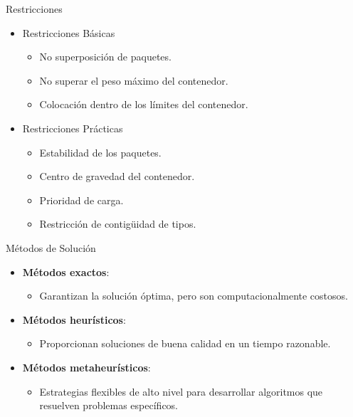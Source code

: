 \documentclass{beamer}
\begin{document}
\begin{frame}{Restricciones}
    \begin{itemize}[<+-| alert@+>]
        \item Restricciones Básicas
              \begin{itemize}
                  \item No superposición de paquetes.
                  \item No superar el peso máximo del contenedor.
                  \item Colocación dentro de los límites del contenedor.
              \end{itemize}
        \item Restricciones Prácticas
              \begin{itemize}
                  \item Estabilidad de los paquetes.
                  \item Centro de gravedad del contenedor.
                  \item Prioridad de carga.
                  \item Restricción de contigüidad de tipos.
              \end{itemize}
    \end{itemize}
\end{frame}

\begin{frame}{Métodos de Solución}
    \begin{itemize}[<+-| alert@+>]
        \item \textbf{Métodos exactos}:
              \begin{itemize}
                  \item Garantizan la solución óptima, pero son computacionalmente costosos.
              \end{itemize}
        \item \textbf{Métodos heurísticos}:
              \begin{itemize}
                  \item Proporcionan soluciones de buena calidad en un tiempo razonable.
              \end{itemize}
        \item \textbf{Métodos metaheurísticos}:
              \begin{itemize}
                  \item Estrategias flexibles de alto nivel para desarrollar algoritmos que resuelven problemas específicos.
              \end{itemize}
    \end{itemize}
\end{frame}
\end{document}
